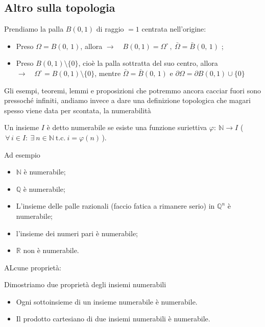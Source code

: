 \subsection{Altro sulla topologia}
%
Prendiamo la palla $B(0, 1)$ di raggio $=1$ centrata nell'origine:
\begin{itemize}
	\item Preso $\Omega = B(0,\, 1)$, allora $\rightarrow\quad B(0, 1)=\Omega^\circ\, ,\ \bar \Omega = \bar B(0,\, 1)$ ;
	\item Preso $B(0, 1)\setminus \{0\}$, cioè la palla sottratta del suo centro, allora $\rightarrow\quad \Omega^\circ = B(0, 1)\setminus \{0\}$, mentre $\bar \Omega = \bar B(0,\, 1)$ e $\partial \Omega = \partial B (0, 1) \cup \{0\}$
\end{itemize}
%
Gli esempi, teoremi, lemmi e proposizioni che potremmo ancora cacciar fuori sono pressoché infiniti, andiamo invece a dare una definizione topologica che magari spesso viene data per scontata, la numerabilità
%
\vspace{0.5cm}
\begin{definition}[\textcolor{blue}{Insieme numerabile}]
	Un insieme $I$ è detto numerabile se esiste una funzione suriettiva $\varphi:\ \mathbb{N} \to I$ ($ \, \forall\, i\in I:\ \exists\ n\in\mathbb{N}\ \text{t.c.}\ i=\varphi (n) \, $).
\end{definition}
%
Ad esempio
\begin{itemize}
		\item $\mathbb{N}$ è numerabile;
		\item $\mathbb{Q}$ è numerabile;
		\item L’insieme delle palle razionali (faccio fatica a rimanere serio) in $\mathbb{Q}^n$ è numerabile;
		\item l'insieme dei numeri pari è numerabile;
		\item $\mathbb{R}$ non è numerabile.
\end{itemize}
%
%
ALcune proprietà:
\begin{prop}
%
Dimostriamo due proprietà degli insiemi numerabili
\begin{itemize}
	\item Ogni sottoinsieme di un insieme numerabile è numerabile.
	\item Il prodotto cartesiano di due insiemi numerabili è numerabile.
\end{itemize}
\end{prop}
%
